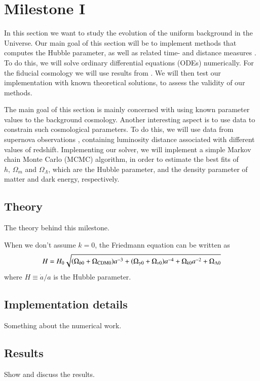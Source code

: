 
\section{Milestone I}\label{M1}
In this section we want to study the evolution of the uniform background in the Universe. Our main goal of this section will be to implement methods that computes the Hubble parameter, as well as related time- and distance measures . To do this, we will solve  ordinary differential equations (ODEs) numerically. For the fiducial cosmology we will use results from \cite{Planck2020}. We will then test our implementation with known theoretical solutions, to assess the validity of our methods. 

The main goal of this section is mainly concerned with using known parameter values to  the background cosmology. Another interesting aspect is to use data to constrain such cosmological parameters. To do this, we will use data from supernova observations \cite{Supernova2014Betoule}, containing luminosity distance associated with different values of redshift. Implementing our solver, we will implement a simple Markov chain Monte Carlo (MCMC) algorithm, in order to estimate the best fits of $h,\,\Omega_m$ and $\Omega_\Lambda$, which are the Hubble parameter, and the density parameter of matter and dark energy, respectively.     


\subsection{Theory}\label{M1:theory}
The theory behind this milestone. 

When we don't assume $k=0$, the Friedmann equation can be written as 
\begin{equation}
    H = H_0 \sqrt{(\Omega_{b0} + \Omega_\mathrm{CDM0})a^{-3} + (\Omega_{\gamma 0} + \Omega_{\nu 0})a^{-4} + \Omega_{k0} a^{-2} + \Omega_{\Lambda 0}} \label{M1:theory:eq:Friedmann_H_omegas}
\end{equation}
where $H\equiv\dot{a}/a$ is the Hubble parameter. 

\subsection{Implementation details}\label{M1:implementation} 
Something about the numerical work.

\subsection{Results}\label{M1:results}
Show and discuss the results.